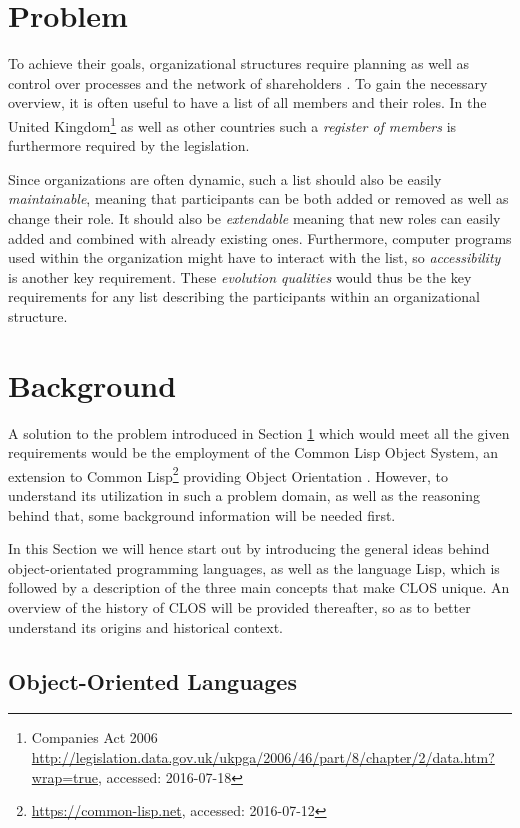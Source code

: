 \documentclass[oribibl]{llncs}
\begin{document}
\section{Problem}
\label{sec:problem}

To achieve their goals, organizational structures require planning as well as control over processes and the network of shareholders \cite[42f.]{Schmidt2000}. To gain the necessary overview, it is often useful to have a list of all members and their roles. In the United Kingdom\footnote{Companies Act 2006 \url{http://legislation.data.gov.uk/ukpga/2006/46/part/8/chapter/2/data.htm?wrap=true}, accessed: 2016-07-18} as well as other countries such a \emph{register of members} is furthermore required by the legislation.

Since organizations are often dynamic, such a list should also be easily \emph{maintainable}, meaning that participants can be both added or removed as well as change their role. It should also be \emph{extendable} meaning that new roles can easily added and combined with already existing ones. Furthermore, computer programs used within the organization might have to interact with the list, so \emph{accessibility} is another key requirement. These \emph{evolution qualities} \cite{young2001effective} would thus be the key requirements for  any list describing the participants within an organizational structure.


\section{Background}
\label{sec:background}
A solution to the problem introduced in Section \ref{sec:problem} which would meet all the given requirements would be the employment of the Common Lisp Object System, an extension to Common Lisp\footnote{\url{https://common-lisp.net}, accessed: 2016-07-12} providing Object Orientation \cite{demichiel1987common}. However, to understand its utilization in such a problem domain, as well as the reasoning behind that, some background information will be needed first.

In this Section we will hence start out by introducing the general ideas behind object-orientated programming languages, as well as the language Lisp, which is followed by a description of the three main concepts that make CLOS unique. An overview of the history of CLOS will be provided thereafter, so as to better understand its origins and historical context.

\subsection{Object-Oriented Languages}
\label{sec:oo}
\end{document}
